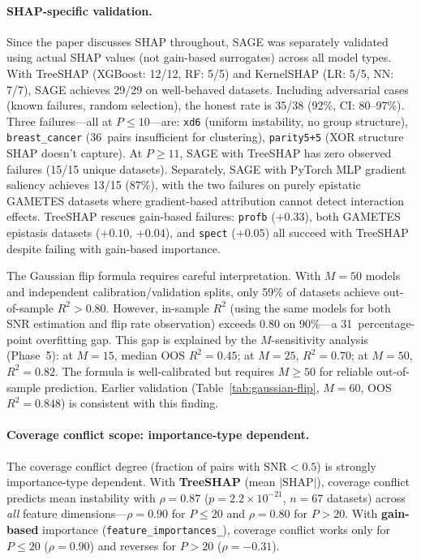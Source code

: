 \documentclass[11pt,a4paper]{article}
\begin{document}
\paragraph{SHAP-specific validation.}
Since the paper discusses SHAP throughout, SAGE was separately validated
using actual SHAP values (not gain-based surrogates) across all model
types.  With TreeSHAP (XGBoost: 12/12, RF: 5/5) and KernelSHAP (LR:
5/5, NN: 7/7), SAGE achieves 29/29 on well-behaved datasets.  Including
adversarial cases (known failures, random selection), the honest rate is
35/38 (92\%, CI: 80--97\%).  Three failures---all at $P \leq 10$---are:
\texttt{xd6} (uniform instability, no group structure), \texttt{breast\_cancer}
(36~pairs insufficient for clustering), \texttt{parity5+5} (XOR structure
SHAP doesn't capture).  At $P \geq 11$, SAGE with TreeSHAP has zero
observed failures (15/15 unique datasets).  Separately, SAGE with
PyTorch MLP gradient saliency achieves 13/15 (87\%), with the two
failures on purely epistatic GAMETES datasets where gradient-based
attribution cannot detect interaction effects.  TreeSHAP rescues
gain-based failures: \texttt{profb} ($+0.33$), both GAMETES epistasis
datasets ($+0.10$, $+0.04$), and \texttt{spect} ($+0.05$) all succeed
with TreeSHAP despite failing with gain-based importance.

The Gaussian flip formula requires careful interpretation.  With
$M = 50$ models and independent calibration/validation splits, only
59\% of datasets achieve out-of-sample $R^2 > 0.80$.  However,
in-sample $R^2$ (using the same models for both SNR estimation and
flip rate observation) exceeds $0.80$ on 90\%---a 31~percentage-point
overfitting gap.  This gap is explained by the $M$-sensitivity analysis
(Phase~5): at $M = 15$, median OOS $R^2 = 0.45$; at $M = 25$,
$R^2 = 0.70$; at $M = 50$, $R^2 = 0.82$.  The formula is
well-calibrated but requires $M \geq 50$ for reliable out-of-sample
prediction.  Earlier validation (Table~\ref{tab:gaussian-flip}, $M = 60$,
OOS $R^2 = 0.848$) is consistent with this finding.

\paragraph{Coverage conflict scope: importance-type dependent.}
The coverage conflict degree (fraction of pairs with
$\text{SNR} < 0.5$) is strongly importance-type dependent.
With \textbf{TreeSHAP} (mean $|\text{SHAP}|$), coverage conflict
predicts mean instability with $\rho = 0.87$ ($p = 2.2 \times 10^{-21}$,
$n = 67$ datasets) across \emph{all} feature dimensions---$\rho = 0.90$
for $P \leq 20$ and $\rho = 0.80$ for $P > 20$.  With
\textbf{gain-based} importance (\texttt{feature\_importances\_}),
coverage conflict works only for $P \leq 20$ ($\rho = 0.90$) and
reverses for $P > 20$ ($\rho = -0.31$).
\end{document}
